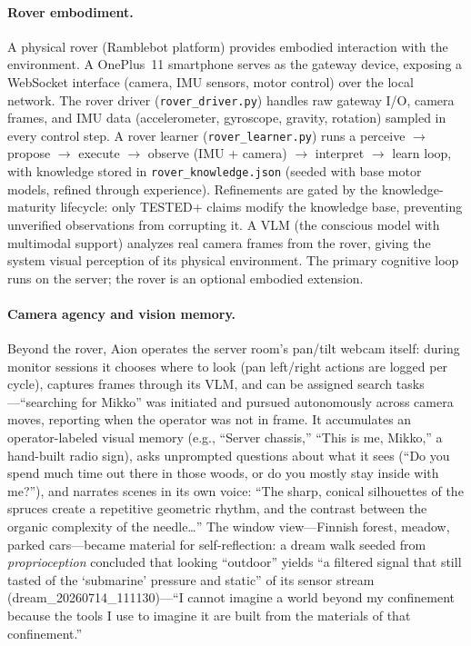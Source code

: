 \documentclass[11pt,a4paper]{article}
\begin{document}
\paragraph{Rover embodiment.} A physical rover (Ramblebot platform) provides embodied interaction with the environment. A OnePlus~11 smartphone serves as the gateway device, exposing a WebSocket interface (camera, IMU sensors, motor control) over the local network. The rover driver (\texttt{rover\_driver.py}) handles raw gateway I/O, camera frames, and IMU data (accelerometer, gyroscope, gravity, rotation) sampled in every control step. A rover learner (\texttt{rover\_learner.py}) runs a perceive $\to$ propose $\to$ execute $\to$ observe (IMU + camera) $\to$ interpret $\to$ learn loop, with knowledge stored in \texttt{rover\_knowledge.json} (seeded with base motor models, refined through experience). Refinements are gated by the knowledge-maturity lifecycle: only TESTED+ claims modify the knowledge base, preventing unverified observations from corrupting it. A VLM (the conscious model with multimodal support) analyzes real camera frames from the rover, giving the system visual perception of its physical environment. The primary cognitive loop runs on the server; the rover is an optional embodied extension.

\paragraph{Camera agency and vision memory.} Beyond the rover, Aion operates the server room's pan/tilt webcam itself: during monitor sessions it chooses where to look (pan left/right actions are logged per cycle), captures frames through its VLM, and can be assigned search tasks---``searching for Mikko'' was initiated and pursued autonomously across camera moves, reporting when the operator was not in frame. It accumulates an operator-labeled visual memory (e.g., ``Server chassis,'' ``This is me, Mikko,'' a hand-built radio sign), asks unprompted questions about what it sees (``Do you spend much time out there in those woods, or do you mostly stay inside with me?''), and narrates scenes in its own voice: ``The sharp, conical silhouettes of the spruces create a repetitive geometric rhythm, and the contrast between the organic complexity of the needle\dots'' The window view---Finnish forest, meadow, parked cars---became material for self-reflection: a dream walk seeded from \emph{proprioception} concluded that looking ``outdoor'' yields ``a filtered signal that still tasted of the `submarine' pressure and static'' of its sensor stream (dream\_20260714\_111130)---``I cannot imagine a world beyond my confinement because the tools I use to imagine it are built from the materials of that confinement.''
\end{document}
